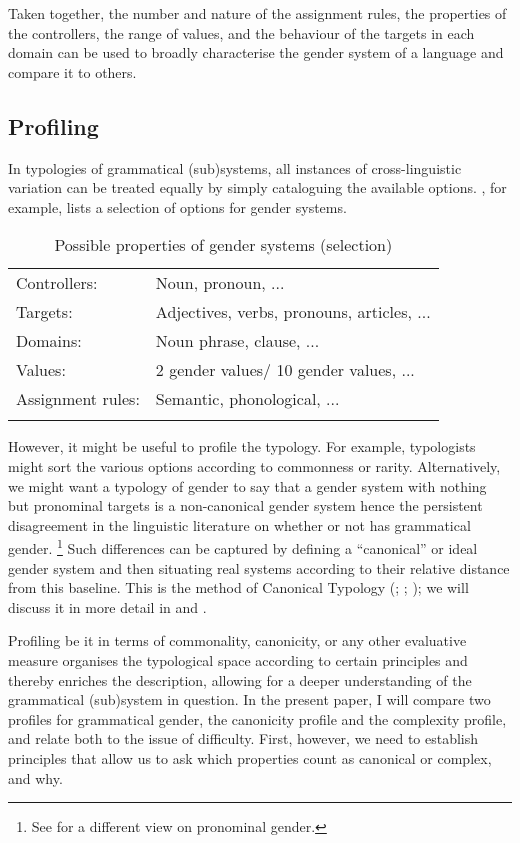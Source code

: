 \documentclass[output=collectionpaper]{langsci/langscibook}
\begin{document}
Taken together, the number and nature of the assignment rules, the properties of the controllers, the range of values, and the behaviour of the targets in each domain can be used to broadly characterise the gender system of a language and compare it to others.


\subsection{Profiling}

In typologies of grammatical (sub)systems, all instances of cross-linguistic variation can be treated equally by simply cataloguing the available options. , for example, lists a selection of options for gender systems.

\begin{table}[htb]
\begin{tabular}{ll}
\lsptoprule
Controllers: & Noun, pronoun, ...\\
Targets: & Adjectives, verbs, pronouns, articles, ...\\
Domains: & Noun phrase, clause, ...\\
Values: & 2 gender values/ 10 gender values, ...\\
Assignment rules: & Semantic, phonological, ...\\
\lspbottomrule
\end{tabular}
\caption{Possible properties of gender systems (selection)}
\label{tab:Audr:Props}
\end{table}

However, it might be useful to profile the typology. For example, typologists might sort the various options according to commonness or rarity. Alternatively, we might want a typology of gender to say that a gender system with nothing but pronominal targets is a non-canonical gender system \textendash{} hence the persistent disagreement in the linguistic literature on whether or not  has grammatical gender.%
\footnote{See  for a different view on pronominal gender.} %
Such differences can be captured by defining a ``canonical'' or ideal gender system and then situating real systems according to their relative distance from this baseline. This is the method of Canonical Typology (\citealt{Corbett2006,Corbett2012}; \citealt{Brown2013}; \citealt{Corbett2016}); we will discuss it in more detail in  and .

Profiling \textendash{} be it in terms of commonality, canonicity, or any other evaluative measure \textendash{} organises the typological space according to certain principles and thereby enriches the description, allowing for a deeper understanding of the grammatical (sub)system in question. In the present paper, I will compare two profiles for grammatical gender, the canonicity profile and the complexity profile, and relate both to the issue of difficulty. First, however, we need to establish principles that allow us to ask which properties count as canonical or complex, and why.
\end{document}
